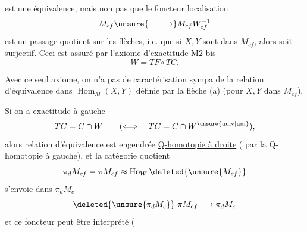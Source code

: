 est une équivalence, mais non pas que le foncteur localisation
\[
 M_{cf}\unsure{-|\longrightarrow}M_{cf}W_{cf}^{-1}
\]
est un  passage  quotient sur les flèches, i.e. que si $X,Y$ sont dans $M_{cf}$, alors
soit surjectif. Ceci est assuré par l'axiome d'exactitude $\mathrm M2$ bis
\[
 W=TF\circ TC.
\]

 Avec ce seul axiome, on n'a pas de caractérisation sympa de la relation d'équivalence dans $\operatorname{Hom}_{M}(X,Y)$ définie par la flèche (a) (pour $X,Y$ dans $M_{cf}$).

Si on a exactitude à gauche
\[
 TC=C\cap W\qquad(\Longleftrightarrow\quad TC=C\cap W^{\unsure{\mathrm{univ}|\mathrm{uni}}}),
\]
alors  relation d'équivalence est  engendrée  \uline{Q-homotopie à droite} ( par la Q-homotopie à gauche), et la catégorie quotient
\[
 \pi_{d}M_{cf}=\pi M_{cf}\approx\operatorname{Ho}_{W}\deleted{\unsure{M_{cf}}}
\]
s'envoie dans $\pi_{d}M_{c}$
\[
 \deleted{\unsure{\pi_{d}M_{c}}}\ \pi M_{cf}\longrightarrow\pi_{d}M_{c}
\]
et ce foncteur peut être interprété  (

